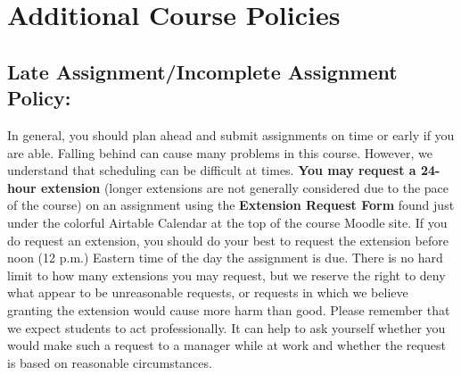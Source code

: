\section*{Additional Course Policies}
\subsection*{Late Assignment/Incomplete Assignment Policy:}
In general, you should plan ahead and submit assignments on time or early if you are able. 
Falling behind can cause many problems in this course. 
However, we understand that scheduling can be difficult at times. 
\textbf{You may request a 24-hour extension} 
(longer extensions are not generally considered due to the pace of the course) 
on an assignment using the \textbf{Extension Request Form} 
found just under the colorful Airtable Calendar at the top of the course Moodle site. 
If you do request an extension, 
you should do your best to request the extension 
before noon (12 p.m.) Eastern time of the day the assignment is due.  
There is no hard limit to how many extensions you may request, 
but we reserve the right to deny what appear to be unreasonable requests, 
or requests in which we believe granting the extension 
would cause more harm than good. 
Please remember that we expect students to act professionally. 
It can help to ask yourself whether you would 
make such a request to a manager while at work 
and whether the request is based on reasonable circumstances. 

